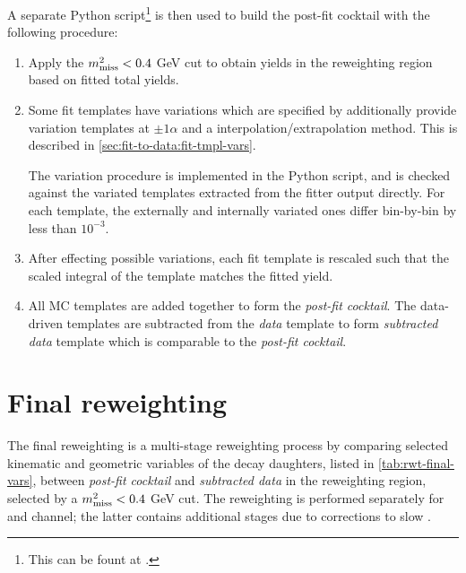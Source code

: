 A separate Python script\footnote{
    This can be fount at .
} is then used to build the post-fit cocktail with the following procedure:
\begin{enumerate}
    \item Apply the $m^2_\text{miss} < 0.4$ GeV cut to obtain yields in the reweighting
        region based on fitted total yields.

    \item Some fit templates have variations which are specified by
        additionally provide variation templates at $\pm 1 \alpha$ and a
        interpolation/extrapolation method.
        This is described in \cref{sec:fit-to-data:fit-tmpl-vars}.

        The variation procedure is implemented in the Python script,
        and is checked against the variated templates extracted from the
        fitter output directly.
        For each template, the externally and internally variated ones differ
        bin-by-bin by less than $10^{-3}$.

    \item After effecting possible variations,
        each fit template is rescaled such that the scaled integral of the
        template matches the fitted yield.

    \item All MC templates are added together to form the
        \emph{post-fit cocktail}.
        The data-driven templates are subtracted from the \emph{data}
        template to form \emph{subtracted data} template
        which is comparable to the \emph{post-fit cocktail}.
\end{enumerate}


\section{Final reweighting}
\label{ref:mc-cor:final}

The final reweighting is a multi-stage reweighting process by comparing
selected
kinematic and geometric variables of the \B decay daughters,
listed in \cref{tab:rwt-final-vars},
between \emph{post-fit cocktail} and \emph{subtracted data}
in the reweighting region, selected by a $m^2_\text{miss} < 0.4$ GeV cut.
The reweighting is performed separately for \Dz and \Dstar channel;
the latter contains additional stages due to corrections to slow \pion.

